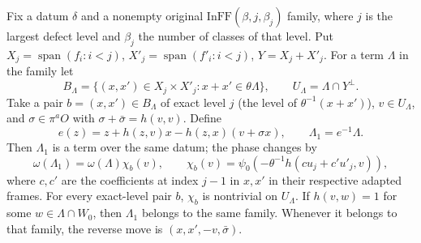 \begin{lemma}
\label{lem:flag-second-type-moves}
Fix a datum \(\delta\) and a nonempty original
\(\mathrm{InFF}(\beta,j,\beta_j)\) family, where
\(j\) is the largest defect level and \(\beta_j\) the
number of classes of that level. Put
\(X_j=\operatorname{span}(f_i:i<j)\),
\(X'_j=\operatorname{span}(f'_i:i<j)\), \(Y=X_j+X'_j\).
For a term \(\Lambda\) in the family let
\[
 B_\Lambda=\{(x,x')\in X_j\times X'_j:
                          x+x'\in\theta\Lambda\},\qquad
 U_\Lambda=\Lambda\cap Y^\perp .
\]
Take a pair \(b=(x,x')\in B_\Lambda\) of exact level
\(j\) (the level of \(\theta^{-1}(x+x')\)),
\(v\in U_\Lambda\), and \(\sigma\in\pi^aO\) with
\(\sigma+\bar\sigma=h(v,v)\).
Define
\[
 e(z)=z+h(z,v)x-h(z,x)(v+\sigma x),\qquad
 \Lambda_1=e^{-1}\Lambda .
 \tag{STC3}
\]
Then \(\Lambda_1\) is a term over the same datum;
the phase changes by
\[
 \omega(\Lambda_1)=\omega(\Lambda)\chi_b(v),\qquad
 \chi_b(v)=\psi_0\left(-\theta^{-1}
                h(cu_j+c'u'_j,v)\right),           \tag{STC4}
\]
where \(c,c'\) are the coefficients at index \(j-1\)
in \(x,x'\) in their respective adapted frames.
For every exact-level pair \(b\), \(\chi_b\) is
nontrivial on \(U_\Lambda\).
If \(h(v,w)=1\) for some \(w\in\Lambda\cap W_0\),
then \(\Lambda_1\) belongs to the same family.
Whenever it belongs to that family, the reverse
move is \((x,x',-v,\bar\sigma)\).
\end{lemma}

